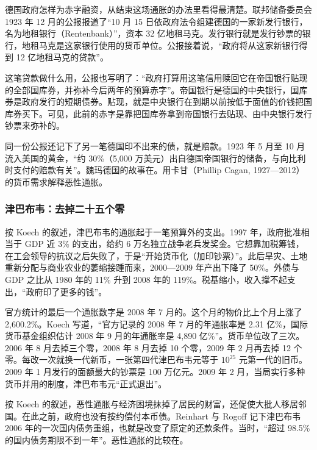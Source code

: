 德国政府怎样为赤字融资，从结束这场通胀的办法里看得最清楚。联邦储备委员会 1923 年 12 月的公报报道了“10 月 15 日依政府法令组建德国的一家新发行银行，名为地租银行（Rentenbank）”，资本 32 亿地租马克。发行银行就是发行钞票的银行，地租马克是这家银行使用的货币单位。公报接着说，“政府将从这家新银行得到 12 亿地租马克的贷款”\cite{frb1923}。

这笔贷款做什么用，公报也写明了：“政府打算用这笔信用赎回它在帝国银行贴现的全部国库券，并弥补今后两年的预算赤字”。帝国银行是德国的中央银行，国库券是政府发行的短期债券。贴现，就是中央银行在到期以前按低于面值的价钱把国库券买下。可见，此前的赤字是靠把国库券拿到帝国银行去贴现、由中央银行发行钞票来弥补的。

同一份公报还记下了另一笔德国印不出来的债，就是赔款。1923 年 5 月至 10 月流入美国的黄金，“约 30\%（5,000 万美元）出自德国帝国银行的储备，与向比利时支付的赔款有关”\cite{frb1923}。魏玛德国的故事在。用卡甘（Phillip Cagan, 1927—2012）的货币需求解释恶性通胀。

\subsubsection{津巴布韦：去掉二十五个零}
按 Koech 的叙述，津巴布韦的通胀起于一笔预算外的支出。1997 年，政府批准相当于 GDP 近 3\% 的支出，给约 6 万名独立战争老兵发奖金。它想靠加税筹钱，在工会领导的抗议之后失败了，于是“开始货币化（加印钞票）”\cite{koech2011}。此后旱灾、土地重新分配与商业农业的萎缩接踵而来，2000—2009 年产出下降了 50\%。外债与 GDP 之比从 1980 年的 11\% 升到 2008 年的 119\%。税基缩小，收入撑不起支出，“政府印了更多的钱”\cite{koech2011}。

官方统计的最后一个通胀数字是 2008 年 7 月的。这个月的物价比上个月上涨了 2,600.2\%。Koech 写道，“官方记录的 2008 年 7 月的年通胀率是 2.31 亿\%，国际货币基金组织估计 2008 年 9 月的年通胀率是 4,890 亿\%”\cite{koech2011}。货币单位改了三次。2006 年 8 月去掉三个零，2008 年 8 月去掉 10 个零，2009 年 2 月再去掉 12 个零。每改一次就换一代新币，一张第四代津巴布韦元等于 $10^{25}$ 元第一代的旧币。2009 年 1 月发行的面额最大的钞票是 100 万亿元。2009 年 2 月，当局实行多种货币并用的制度，津巴布韦元“正式退出”\cite{koech2011}。

按 Koech 的叙述，恶性通胀与经济困境抹掉了居民的财富，还促使大批人移居邻国\cite{koech2011}。在此之前，政府也没有按约偿付本币债。Reinhart 与 Rogoff 记下津巴布韦 2006 年的一次国内债务重组，也就是改变了原定的还款条件。当时，“超过 98.5\% 的国内债务期限不到一年”\cite{reinhart2008}。恶性通胀的比较在。

